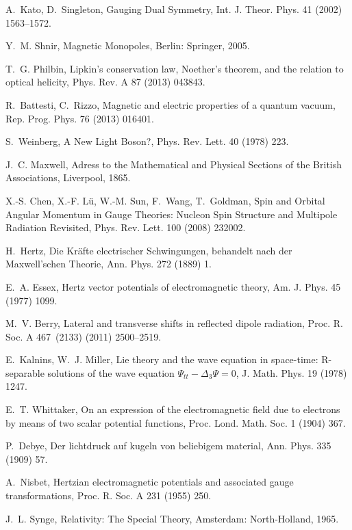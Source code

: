\documentclass[1p,sort&compress]{elsarticle}
\numberwithin{equation}{section}
\begin{document}
\begin{thebibliography}{999}
A.~Kato, D.~Singleton, {Gauging Dual Symmetry}, Int. J. Theor. Phys. 41 (2002)
  1563--1572.

Y.~M. Shnir, {Magnetic Monopoles}, Berlin: Springer, 2005.

T.~G. Philbin, {Lipkin's conservation law, Noether's theorem, and the relation
  to optical helicity}, Phys. Rev. A 87 (2013) 043843.

R.~Battesti, C.~Rizzo, {Magnetic and electric properties of a quantum vacuum},
  Rep. Prog. Phys. 76 (2013) 016401.

S.~Weinberg, {A New Light Boson?}, Phys. Rev. Lett. 40 (1978) 223.

J.~C. Maxwell, {Adress to the Mathematical and Physical Sections of the British
  Associations}, Liverpool, 1865.

X.-S. Chen, X.-F. L\"u, W.-M. Sun, F.~Wang, T.~Goldman, {Spin and Orbital
  Angular Momentum in Gauge Theories: Nucleon Spin Structure and Multipole
  Radiation Revisited}, {Phys. Rev. Lett.} 100 (2008) 232002.

H.~Hertz, {Die Kr\"afte electrischer Schwingungen, behandelt nach der
  Maxwell'schen Theorie}, Ann. Phys. 272 (1889) 1.

E.~A. Essex, {Hertz vector potentials of electromagnetic theory}, Am. J. Phys.
  45 (1977) 1099.

M.~V. Berry, {Lateral and transverse shifts in reflected dipole radiation},
  Proc. R. Soc. A 467~(2133) (2011) 2500--2519.

E.~Kalnins, W.~J. Miller, {Lie theory and the wave equation in space-time:
  R-separable solutions of the wave equation $\Psi_{tt} - \Delta_3 \Psi = 0$},
  J. Math. Phys. 19 (1978) 1247.

E.~T. Whittaker, {On an expression of the electromagnetic field due to
  electrons by means of two scalar potential functions}, Proc. Lond. Math. Soc.
  1 (1904) 367.

P.~Debye, {Der lichtdruck auf kugeln von beliebigem material}, Ann. Phys. 335
  (1909) 57.

A.~Nisbet, {Hertzian electromagnetic potentials and associated gauge
  transformations}, Proc. R. Soc. A 231 (1955) 250.

J.~L. Synge, {Relativity: The Special Theory}, Amsterdam: North-Holland, 1965.


\end{thebibliography}
\end{document}
